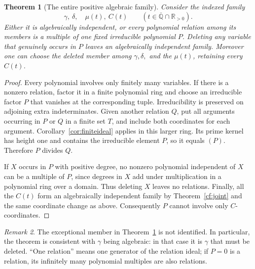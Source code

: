 \documentclass[11pt]{article}
\newtheorem{theorem}{Theorem}[section]
\theoremstyle{definition}
\theoremstyle{remark}
\newtheorem{remark}[theorem]{Remark}
\newcommand{\Qa}{\overline{\mathbb Q}}
\begin{document}
\begin{theorem}[The entire positive algebraic family]\label{thm:infinite}
Consider the indexed family
\begin{equation}\label{eq:infinite}
\gamma,\ \delta,\quad \mu(t),\ C(t)
\qquad(t\in\Qa\cap\mathbb R_{>0}).
\end{equation}
Either it is algebraically independent, or every polynomial relation
among its members is a multiple of one fixed irreducible polynomial $P$.
Deleting any variable that genuinely occurs in $P$ leaves an algebraically
independent family. Moreover one can choose the deleted member among
$\gamma,\delta,$ and the $\mu(t)$, retaining every $C(t)$.
\end{theorem}
\begin{proof}
Every polynomial involves only finitely many variables. If there is a
nonzero relation, factor it in a finite polynomial ring and choose an
irreducible factor $P$ that vanishes at the corresponding tuple.
Irreducibility is preserved on adjoining extra indeterminates. Given
another relation $Q$, put all arguments occurring in $P$ or $Q$ in a
finite set $T$, and include both coordinates for each argument.
Corollary~\ref{cor:finiteideal} applies in this larger ring. Its prime
kernel has height one and contains the irreducible element $P$, so
it equals $(P)$. Therefore $P$ divides $Q$.

If $X$ occurs in $P$ with positive degree, no nonzero polynomial
independent of $X$ can be a multiple of $P$, since degrees in $X$ add
under multiplication in a polynomial ring over a domain. Thus deleting
$X$ leaves no relations. Finally, all the $C(t)$ form an algebraically
independent family by Theorem~\ref{cf:joint} and the same coordinate change
as above. Consequently $P$ cannot involve only $C$-coordinates.
\end{proof}

\begin{remark}
The exceptional member in Theorem~\ref{thm:infinite} is not identified.
In particular, the theorem is consistent with $\gamma$ being algebraic:
in that case it is $\gamma$ that must be deleted. ``One relation'' means
one generator of the relation ideal; if $P=0$ is a relation, its infinitely
many polynomial multiples are also relations.
\end{remark}
\end{document}
